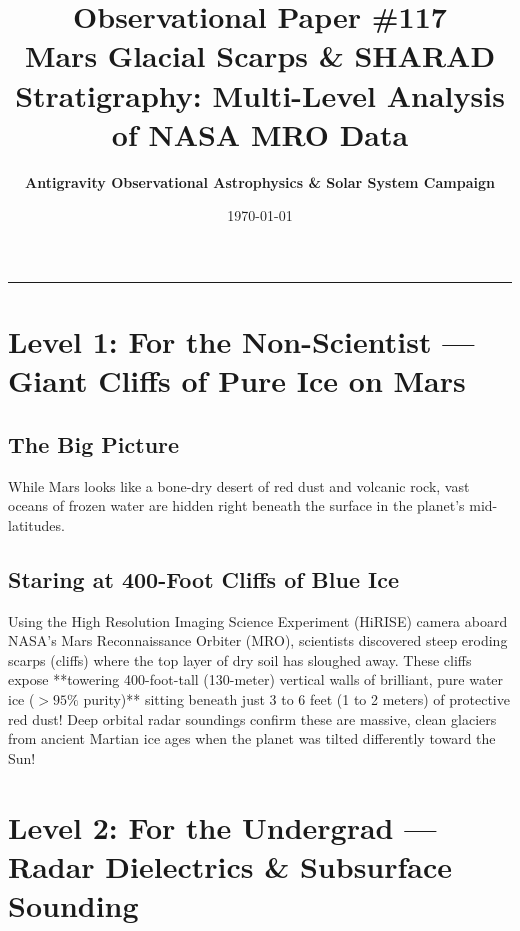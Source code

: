 \documentclass[11pt,a4paper]{article}
\title{\Huge \textbf{Observational Paper \#117}\\ \Large Mars Glacial Scarps \& SHARAD Stratigraphy: Multi-Level Analysis of NASA MRO Data}
\author{\textbf{Antigravity Observational Astrophysics \& Solar System Campaign}}
\date{\today}
\begin{document}
\maketitle

\vspace{-1em}
\begin{center}
\rule{\textwidth}{1.5pt}
\end{center}

\section*{Level 1: For the Non-Scientist — Giant Cliffs of Pure Ice on Mars}

\subsection*{The Big Picture}
While Mars looks like a bone-dry desert of red dust and volcanic rock, vast oceans of frozen water are hidden right beneath the surface in the planet's mid-latitudes.

\subsection*{Staring at 400-Foot Cliffs of Blue Ice}
Using the High Resolution Imaging Science Experiment (HiRISE) camera aboard NASA's Mars Reconnaissance Orbiter (MRO), scientists discovered steep eroding scarps (cliffs) where the top layer of dry soil has sloughed away. These cliffs expose **towering 400-foot-tall (130-meter) vertical walls of brilliant, pure water ice ($>95\%$ purity)** sitting beneath just 3 to 6 feet (1 to 2 meters) of protective red dust! Deep orbital radar soundings confirm these are massive, clean glaciers from ancient Martian ice ages when the planet was tilted differently toward the Sun!

\newpage

\section*{Level 2: For the Undergrad — Radar Dielectrics \& Subsurface Sounding}
\end{document}
